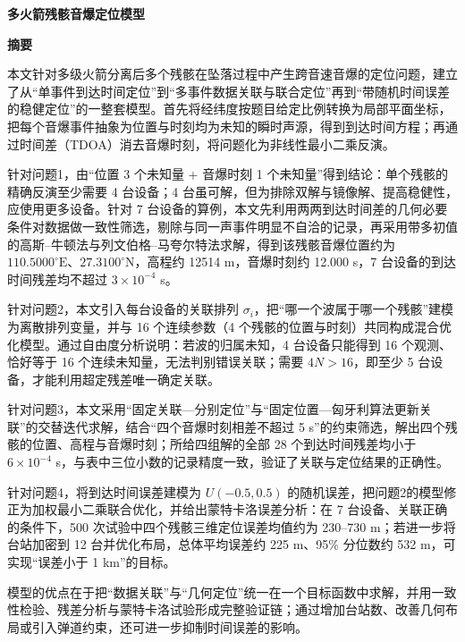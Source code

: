 \documentclass[12pt,a4paper]{article}
\begin{document}
\setcounter{page}{1}

\begin{center}
{\bfseries 多火箭残骸音爆定位模型}


\vspace{2ex}
{\bfseries 摘要}
\end{center}

本文针对多级火箭分离后多个残骸在坠落过程中产生跨音速音爆的定位问题，建立了从“单事件到达时间定位”到“多事件数据关联与联合定位”再到“带随机时间误差的稳健定位”的一整套模型。首先将经纬度按题目给定比例转换为局部平面坐标，把每个音爆事件抽象为位置与时刻均为未知的瞬时声源，得到到达时间方程；再通过时间差（TDOA）消去音爆时刻，将问题化为非线性最小二乘反演。

针对问题1，由“位置 3 个未知量 + 音爆时刻 1 个未知量”得到结论：单个残骸的精确反演至少需要 4 台设备；4 台虽可解，但为排除双解与镜像解、提高稳健性，应使用更多设备。针对 7 台设备的算例，本文先利用两两到达时间差的几何必要条件对数据做一致性筛选，剔除与同一声事件明显不自洽的记录，再采用带多初值的高斯--牛顿法与列文伯格--马夸尔特法求解，得到该残骸音爆位置约为 $110.5000^\circ\mathrm{E}$、$27.3100^\circ\mathrm{N}$，高程约 12514 m，音爆时刻约 12.000 s，7 台设备的到达时间残差均不超过 $3\times10^{-4}$ s。

针对问题2，本文引入每台设备的关联排列 $\sigma_i$，把“哪一个波属于哪一个残骸”建模为离散排列变量，并与 16 个连续参数（4 个残骸的位置与时刻）共同构成混合优化模型。通过自由度分析说明：若波的归属未知，4 台设备只能得到 16 个观测、恰好等于 16 个连续未知量，无法判别错误关联；需要 $4N>16$，即至少 5 台设备，才能利用超定残差唯一确定关联。

针对问题3，本文采用“固定关联—分别定位”与“固定位置—匈牙利算法更新关联”的交替迭代求解，结合“四个音爆时刻相差不超过 5 s”的约束筛选，解出四个残骸的位置、高程与音爆时刻；所给四组解的全部 28 个到达时间残差均小于 $6\times10^{-4}$ s，与表中三位小数的记录精度一致，验证了关联与定位结果的正确性。

针对问题4，将到达时间误差建模为 $U(-0.5,0.5)$ 的随机误差，把问题2的模型修正为加权最小二乘联合优化，并给出蒙特卡洛误差分析：在 7 台设备、关联正确的条件下，500 次试验中四个残骸三维定位误差均值约为 230--730 m；若进一步将台站加密到 12 台并优化布局，总体平均误差约 225 m、95\% 分位数约 532 m，可实现“误差小于 1 km”的目标。

模型的优点在于把“数据关联”与“几何定位”统一在一个目标函数中求解，并用一致性检验、残差分析与蒙特卡洛试验形成完整验证链；通过增加台站数、改善几何布局或引入弹道约束，还可进一步抑制时间误差的影响。
\end{document}
